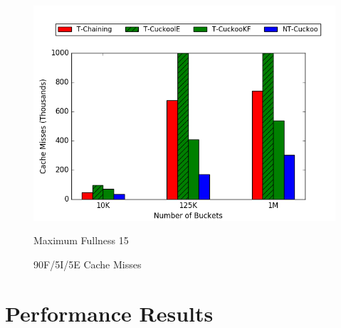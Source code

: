 \begin{figure}[H]
\begin{minipage}{.5\textwidth}
        \includegraphics[width=\linewidth]{maps/9015cm.png}
        \caption*{Maximum Fullness 15}
    \end{minipage}
    \caption{90F/5I/5E Cache Misses}
\end{figure}



\section{Performance Results}
